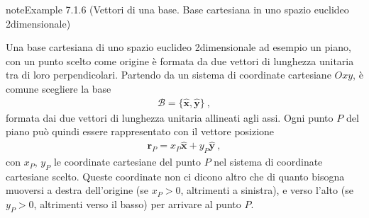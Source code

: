 \documentclass[letterpaper,10pt,italian]{jupyterBook}
\begin{document}
\begin{sphinxadmonition}{note}{Example 7.1.6 (Vettori di una base. Base cartesiana in uno spazio euclideo 2\sphinxhyphen{}dimensionale)}



\sphinxAtStartPar
Una base cartesiana di uno spazio euclideo 2\sphinxhyphen{}dimensionale \sphinxhyphen{} ad esempio un piano, con un punto scelto come origine \sphinxhyphen{} è formata da due vettori di lunghezza unitaria tra di loro perpendicolari. Partendo da un sistema di coordinate cartesiane \(Oxy\), è comune scegliere la base
\begin{equation*}
\begin{split}\mathcal{B} = \{ \hat{\mathbf{x}}, \hat{\mathbf{y}} \} \ ,\end{split}
\end{equation*}
\sphinxAtStartPar
formata dai due vettori di lunghezza unitaria allineati agli assi. Ogni punto \(P\) del piano può quindi essere rappresentato con il vettore posizione
\begin{equation*}
\begin{split}\mathbf{r}_P = x_P \hat{\mathbf{x}} + y_P \hat{\mathbf{y}} \ ,\end{split}
\end{equation*}
\sphinxAtStartPar
con \(x_P\), \(y_P\) le coordinate cartesiane del punto \(P\) nel sistema di coordinate cartesiane scelto. Queste coordinate non ci dicono altro che di quanto bisogna muoversi a destra dell’origine (se \(x_P > 0\), altrimenti a sinistra), e verso l’alto (se \(y_P > 0\), altrimenti verso il basso) per arrivare al punto \(P\).
\end{sphinxadmonition}
\label{ch/algebra/vector-algebra-def:example-6}
\end{document}
